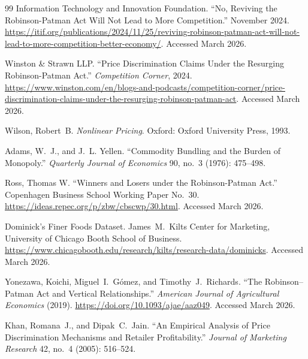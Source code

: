 \documentclass[12pt]{article}
\theoremstyle{definition}
\begin{document}
\begin{thebibliography}{99}
Information Technology and Innovation Foundation.
``No, Reviving the Robinson-Patman Act Will Not Lead to More Competition.''
November 2024.
\url{https://itif.org/publications/2024/11/25/reviving-robinson-patman-act-will-not-lead-to-more-competition-better-economy/}.
Accessed March 2026.

Winston \& Strawn LLP.
``Price Discrimination Claims Under the Resurging Robinson-Patman Act.''
\textit{Competition Corner}, 2024.
\url{https://www.winston.com/en/blogs-and-podcasts/competition-corner/price-discrimination-claims-under-the-resurging-robinson-patman-act}.
Accessed March 2026.

Wilson, Robert~B.
\textit{Nonlinear Pricing}.
Oxford: Oxford University Press, 1993.

Adams, W.~J., and J.~L. Yellen.
``Commodity Bundling and the Burden of Monopoly.''
\textit{Quarterly Journal of Economics} 90, no.~3 (1976): 475--498.

Ross, Thomas W.
``Winners and Losers under the Robinson-Patman Act.''
Copenhagen Business School Working Paper No.~30.
\url{https://ideas.repec.org/p/zbw/cbscwp/30.html}.
Accessed March 2026.

Dominick's Finer Foods Dataset.
James~M.\ Kilts Center for Marketing, University of Chicago Booth School of Business.
\url{https://www.chicagobooth.edu/research/kilts/research-data/dominicks}.
Accessed March 2026.

Yonezawa, Koichi, Miguel~I.\ G\'{o}mez, and Timothy~J.\ Richards.
``The Robinson--Patman Act and Vertical Relationships.''
\textit{American Journal of Agricultural Economics} (2019).
\url{https://doi.org/10.1093/ajae/aaz049}.
Accessed March 2026.

Khan, Romana~J., and Dipak~C.\ Jain.
``An Empirical Analysis of Price Discrimination Mechanisms and Retailer Profitability.''
\textit{Journal of Marketing Research} 42, no.~4 (2005): 516--524.

\end{thebibliography}
\end{document}
